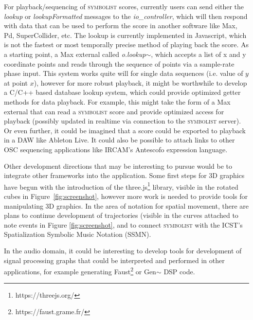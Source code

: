 \documentclass{article}
\def\symbolist{\textsc{symbolist}\xspace}
\def\iocontroller{\textit{io\_controller}\xspace}
\begin{document}
For playback/sequencing of \symbolist scores, currently users can send either the \textit{lookup} or \textit{lookupFormatted} messages to the \iocontroller, which will then respond with data that can be used to perform the score in another software like Max, Pd, SuperCollider, etc.
The lookup is currently implemented in Javascript, which is not the fastest or most temporally precise method of playing back the score.
As a starting point, a Max external called \textit{o.lookup$\sim$}, which accepts a list of x and y coordinate points and reads through the sequence of points via a sample-rate phase input.
This system works quite will for single data sequences (i.e. value of $y$ at point $x$), however for more robust playback, it might be worthwhile to develop a C/C++ based database lookup system, which could provide optimized getter methods for data playback. 
For example, this might take the form of a Max external that can read a \symbolist score and provide optimized access for playback (possibly updated in realtime via connection to the \symbolist server).
Or even further, it could be imagined that a score could be exported to playback in a DAW like Ableton Live.
It could also be possible to attach links to other OSC sequencing applications like IRCAM's Antescofo expression language\cite{giavitto2017time}.

Other development directions that may be interesting to pursue would be to integrate other frameworks into the application.
Some first steps for 3D graphics have begun with the introduction of the three.js\footnote{https://threejs.org/} library, visible in the rotated cubes in Figure~\ref{fig:screenshot}, however more work is needed to provide tools for manipulating 3D graphics.
In the area of notation for spatial movement, there are plans to continue development of trajectories (visible in the curves attached to note events in Figure \ref{fig:screenshot}, and to connect \symbolist with the ICST's Spatialization Symbolic Music Notation (SSMN)\cite{ellberger2014spatialization}.

In the audio domain, it could be interesting to develop tools for development of signal processing graphs that could be interpreted and performed in other applications, for example generating Faust\footnote{https://faust.grame.fr/} or Gen$\sim$ DSP code.%
\end{document}
